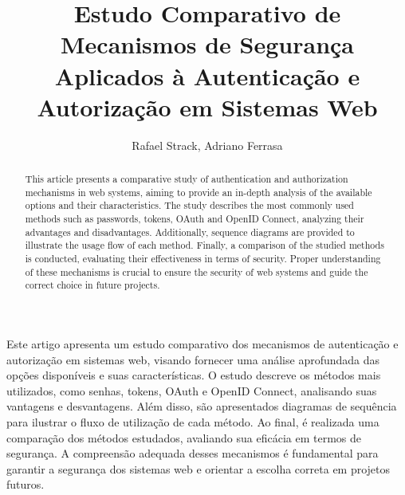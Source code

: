 \documentclass[12pt]{article}
\title{Estudo Comparativo de Mecanismos de Segurança Aplicados à Autenticação e Autorização em 
Sistemas Web}
\author{Rafael Strack\inst{1}, Adriano Ferrasa\inst{1}}
\begin{document}
\maketitle

\begin{abstract}
  This article presents a comparative study of authentication and authorization mechanisms in web
  systems, aiming to provide an in-depth analysis of the available options and their
  characteristics. The study describes the most commonly used methods such as passwords, tokens,
  OAuth and OpenID Connect, analyzing their advantages and disadvantages. Additionally,
  sequence diagrams are provided to illustrate the usage flow of each method. Finally, a comparison
  of the studied methods is conducted, evaluating their effectiveness in terms of security. Proper
  understanding of these mechanisms is crucial to ensure the security of web systems and guide the
  correct choice in future projects.
\end{abstract}

\begin{resumo}
  Este artigo apresenta um estudo comparativo dos mecanismos de autenticação e autorização em
  sistemas web, visando fornecer uma análise aprofundada das opções disponíveis e suas
  características. O estudo descreve os métodos mais utilizados, como senhas, tokens, OAuth e OpenID
  Connect, analisando suas vantagens e desvantagens. Além disso, são apresentados
  diagramas de sequência para ilustrar o fluxo de utilização de cada método. Ao final, é
  realizada uma comparação dos métodos estudados, avaliando sua eficácia em termos de segurança. A
  compreensão adequada desses mecanismos é fundamental para garantir a segurança dos sistemas web e
  orientar a escolha correta em projetos futuros.
\end{resumo}

























\end{document}
